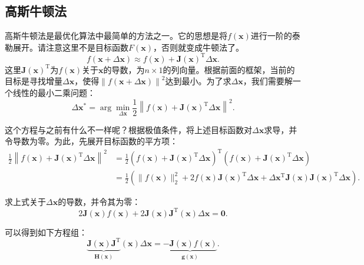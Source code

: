 \subsection{高斯牛顿法}
高斯牛顿法是最优化算法中最简单的方法之一。它的思想是将$f(\bm{x})$进行一阶的泰勒展开。请注意这里不是目标函数$F(\bm{x})$，否则就变成牛顿法了。
\begin{equation}
\label{eq:approximation}
f\left( {\bm{x} + \Delta \bm{x}} \right) \approx f\left( \bm{x} \right) + \bm{J} \left( \bm{x} \right)^\mathrm{T} \Delta \bm{x}.
\end{equation}
这里$\bm{J}(\bm{x})^\mathrm{T}$为$f(\bm{x})$关于$\bm{x}$的导数，为$n \times 1$的列向量。根据前面的框架，当前的目标是寻找增量$\Delta \bm{x}$，使得$\left\| {f\left( \bm{x} + \Delta \bm{x} \right)} \right \|^2$达到最小。为了求$\Delta \bm{x}$，我们需要解一个线性的最小二乘问题：
\begin{equation}
\Delta \bm{x}^* = \arg \mathop {\min }\limits_{\Delta \bm{x}} \frac{1}{2}{\left\| {f\left( \bm{x} \right) + \bm{J} \left( \bm{x} \right)^\mathrm{T} \Delta \bm{x} } \right\|^2}.
\end{equation}

这个方程与之前有什么不一样呢？根据极值条件，将上述目标函数对$\Delta \bm{x}$求导，并令导数为零。为此，先展开目标函数的平方项：
\begin{align*}
\frac{1}{2}{\left\| {f\left( \bm{x} \right) + \bm{J} \left( \bm{x} \right)^\mathrm{T} \Delta \bm{x}} \right\|^2} &= \frac{1}{2}{\left( {f\left( \bm{x} \right) + \bm{J}\left( \bm{x} \right)^\mathrm{T} \Delta \bm{x}} \right)^\mathrm{T}}\left( {f\left( \bm{x} \right) + \bm{J} \left( \bm{x} \right)^\mathrm{T} \Delta \bm{x}} \right)\\
&= \frac{1}{2}\left( \| f{{\left( \bm{x} \right)}\|^2_2 + 2 f\left( \bm{x} \right) \bm{J} {{\left( \bm{x} \right)}}^\mathrm{T} \Delta \bm{x} + \Delta { \bm{x}^\mathrm{T}}{\bm{J} (\bm{x})} \bm{J}(\bm{x})^\mathrm{T} \Delta \bm{x}} \right).
\end{align*}

求上式关于$\Delta \bm{x}$的导数，并令其为零：
\begin{displaymath}
2\bm{J} {\left( \bm{x} \right)}f\left( \bm{x} \right) + 2\bm{J} {\left( \bm{x} \right)} \bm{J}^\mathrm{T} \left( \bm{x} \right)\Delta \bm{x} = \bm{0}.
\end{displaymath}

可以得到如下方程组：
\begin{equation}
\underbrace{\bm{J} {\left( \bm{x} \right)} \bm{J}^\mathrm{T}}_{\bm{H}(\bm{x})} \left( \bm{x} \right)\Delta \bm{x} =  \underbrace{- \bm{J} {\left( \bm{x} \right)} f\left( \bm{x} \right)}_{\bm{g}(\bm{x})}.
\end{equation}

